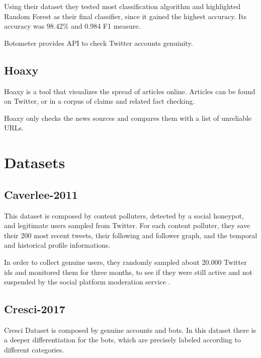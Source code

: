 Using their dataset they tested most classification algorithm and highlighted Random Forest as their final classifier, since it gained the highest accuracy. Its accuracy was 98.42\% and 0.984 F1 measure\cite{Lee11sevenmonths}.

Botometer provides API to check Twitter accounts genuinity.

\subsection{Hoaxy}
Hoaxy is a tool that visualizes the spread of articles online. Articles can be found on Twitter, or in a corpus of claims and related fact checking.

Hoaxy only checks the news sources and compares them with a list of unreliable URLs.

\section{Datasets}

\subsection{Caverlee-2011}
This dataset is composed by content polluters, detected by a social honeypot, and legitimate users sampled from Twitter.
For each content polluter, they save their 200 most recent tweets, their following and follower graph, and the temporal and historical profile informations.

In order to collect genuine users, they randomly sampled about 20.000 Twitter ids and monitored them for three months, to see if they were still active and not suspended by the social platform moderation service \cite{Lee11sevenmonths}.


\subsection{Cresci-2017}
Cresci Dataset is composed by genuine accounts and bots. In this dataset there is a deeper differentiation for the bots, which are precisely labeled according to different categories.

